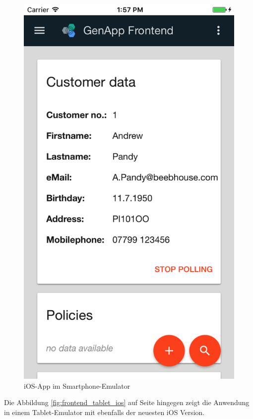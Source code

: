 \begin{figure}[h]
 \centering
   \includegraphics[scale=0.28]{images/kapitel_4/frontend_smartphone_ios.png}
 \caption{iOS-App im Smartphone-Emulator}
 \label{fig:frontend_smartphone_ios}
\end{figure}

Die Abbildung \ref{fig:frontend_tablet_ios} auf Seite \pageref{fig:frontend_tablet_ios} hingegen zeigt die Anwendung in
einem Tablet-Emulator mit ebenfalls der neuesten iOS Version.


